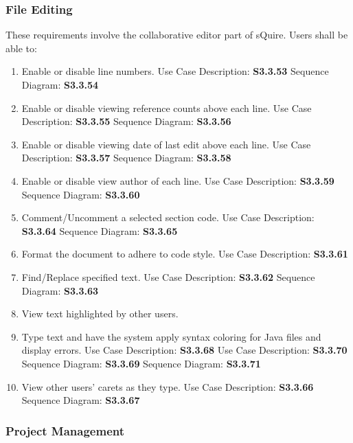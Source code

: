 \documentclass[twoside,letterpaper]{article}
\begin{document}
{\subsubsection{File Editing}

These requirements involve the collaborative editor part of sQuire. Users shall be able to:

\begin{enumerate}
	\item Enable or disable line numbers.
		\subitem Use Case Description: \textbf{S3.3.53}
		\subitem Sequence Diagram: \textbf{S3.3.54}
	\item Enable or disable viewing reference counts above each line.
		\subitem Use Case Description: \textbf{S3.3.55}
		\subitem Sequence Diagram: \textbf{S3.3.56}
	\item Enable or disable viewing date of last edit above each line.
		\subitem Use Case Description: \textbf{S3.3.57}
		\subitem Sequence Diagram: \textbf{S3.3.58}
	\item Enable or disable view author of each line.
		\subitem Use Case Description: \textbf{S3.3.59}
		\subitem Sequence Diagram: \textbf{S3.3.60}
	\item Comment/Uncomment a selected section code.
		\subitem Use Case Description: \textbf{S3.3.64}
		\subitem Sequence Diagram: \textbf{S3.3.65}
	\item Format the document to adhere to code style.
		\subitem Use Case Description: \textbf{S3.3.61}
	\item Find/Replace specified text.
		\subitem Use Case Description: \textbf{S3.3.62}
		\subitem Sequence Diagram: \textbf{S3.3.63}
	\item View text highlighted by other users.
	\item Type text and have the system apply syntax coloring for Java files and display errors.
		\subitem Use Case Description: \textbf{S3.3.68}
		\subitem Use Case Description: \textbf{S3.3.70}
		\subitem Sequence Diagram: \textbf{S3.3.69}
		\subitem Sequence Diagram: \textbf{S3.3.71}
	\item View other users' carets as they type.
		\subitem Use Case Description: \textbf{S3.3.66}
		\subitem Sequence Diagram: \textbf{S3.3.67}
\end{enumerate}

\subsubsection{Project Management}

}
\end{document}
